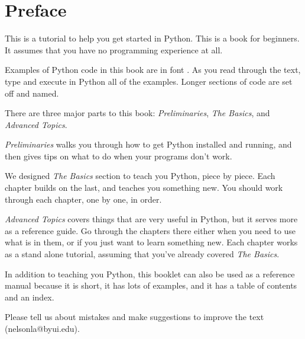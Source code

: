 \chapter*{Preface}

This is a tutorial to help you get started in Python.  This is a book for beginners. It assumes that you have no programming experience at all.

Examples of Python code in this book are in font . As you read through the text, type and execute in Python all
of the examples. Longer sections of code
are set off and named.

There are three major parts to this book: {\em Preliminaries}, {\em The Basics}, and {\em Advanced Topics}.

{\em Preliminaries} walks you through how to get Python installed and running, and then gives tips on what to do when your programs don't work.

We designed {\em The Basics} section to teach you Python, piece by piece.  Each chapter builds on the last, and teaches you something new. You should work through each chapter, one by one, in order.

{\em Advanced Topics} covers things that are very useful in Python, but it serves more as a reference guide.  Go through the chapters there either when you need to use what is in them, or if you just want to learn something new.  Each chapter works as a stand alone tutorial, assuming that you've already covered {\em The Basics}.

In addition to teaching you Python, this booklet can also be used as a reference manual because it is
short, it has lots of examples, and it has a table of contents and
an index.

 Please tell us about mistakes and make suggestions to improve the text
(nelsonla@byui.edu).

